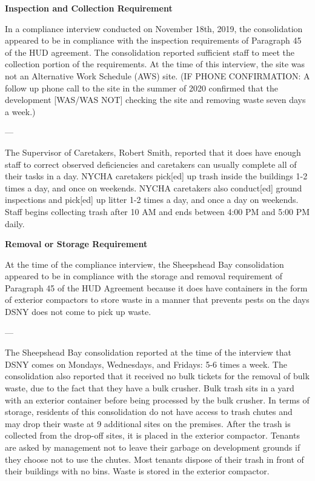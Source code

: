 
\textbf{Inspection and Collection Requirement}

In a compliance interview conducted on November 18th, 2019, the consolidation appeared to be in compliance with the inspection requirements of Paragraph 45 of the HUD agreement. The consolidation reported sufficient staff to meet the collection portion of the requirements. At the time of this interview, the site was not an Alternative Work Schedule (AWS) site. (IF PHONE CONFIRMATION: A follow up phone call to the site in the summer of 2020 confirmed that the development [WAS/WAS NOT] checking the site and removing waste seven days a week.)

---

The Supervisor of Caretakers, Robert Smith, reported that it does have enough staff to correct observed deficiencies and caretakers can usually complete all of their tasks in a day. NYCHA caretakers pick[ed] up trash inside the buildings 1-2 times a day, and once on weekends. NYCHA caretakers also conduct[ed] ground inspections and pick[ed] up litter 1-2 times a day, and once a day on weekends. Staff begins collecting trash after 10 AM and ends between 4:00 PM and 5:00 PM daily. 

\textbf{Removal or Storage Requirement}

At the time of the compliance interview, the Sheepshead Bay consolidation appeared to be in compliance with the storage and removal requirement of Paragraph 45 of the HUD Agreement because it does have containers in the form of exterior compactors to store waste in a manner that prevents pests on the days DSNY does not come to pick up waste.

---

The Sheepshead Bay consolidation reported at the time of the interview that DSNY comes on Mondays, Wednesdays, and Fridays: 5-6 times a week. The consolidation also reported that it received no bulk tickets for the removal of bulk waste, due to the fact that they have a bulk crusher. Bulk trash sits in a yard with an exterior container before being processed by the bulk crusher. In terms of storage, residents of this consolidation do not have access to trash chutes and may drop their waste at 9 additional sites on the premises. After the trash is collected from the drop-off sites, it is placed in the exterior compactor. Tenants are asked by management not to leave their garbage on development grounds if they choose not to use the chutes. Most tenants dispose of their trash in front of their buildings with no bins. Waste is stored in the exterior compactor. 

